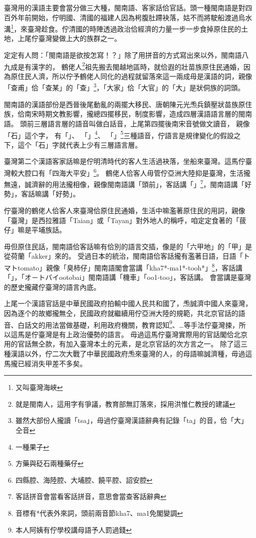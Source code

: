 \documentclass[final,oneside,onecolumn,12pt,a4paper]{book}%
\begin{document}
臺灣用的漢語主要會當分做三大種，閩南語、客家話佮官話\cite{外省族群的母語與國語}。頭一種閩南語是對四百外年前開始，佇明國、清國的福建人因為枵腹肚蹛袂落，姑不而將駛船渡過烏水溝\footnote{又叫臺灣海峽}，來臺灣趁食。佇清國的時陣透過政治佮經濟的力量一步一步食掉原住民的土地，上尾佇臺灣變做上大的族群之一。

定定有人問：「閩南語是欲按怎寫！？」除了用拼音的方式寫出來以外，閩南語八九成是有漢字的\cite{愛揣}，%
鶴佬人\footnote{就是閩南人，這用字有爭議，教育部無訂落來，採用洪惟仁教授的建議\cite{愛揣}}祖先搬去閩越地區時，就佮遐的壯苗族原住民通婚，因為原住民人濟，所以佇予鶴佬人同化的過程就留落來這一兩成毋是漢語的詞\cite{董忠司}，親像「查甫」佮「查某」的「查」\footnote{雖然大部份人攏讀「tsa」，毋過佇臺灣漢語辭典\cite{臺灣漢語辭典}有記錄「ta」的音，佮「大」仝音}，「大家」佮「大官」的「大」是狀侗族的詞頭。

閩南語的漢語部份是西晉後尾動亂的兩擺大移民、唐朝陳元光𤆬兵鎮壓狀苗族原住族，佮南宋時期文教影響，攏總四擺移民，制度影響，造成四層漢語語言層的閩南語\cite{閩客方言史稿}。
頭前三層語言層的語音叫做白話音，上尾第四擺後南宋音號做文讀音，
親像「石」這个字，
有「」、
「」\footnote{一種果子}、
「」\footnote{方藥與砭石兩種藥仔}三種語音，佇語言是規律變化的假設之下，這个「石」字就代表上少有三層語言層。

臺灣第二个漢語客家話嘛是佇明清時代的客人生活過袂落，坐船來臺灣。這馬佇臺灣較大腔口有「四海大平安」\footnote{四縣腔、海陸腔、大埔腔、饒平腔、詔安腔}。
鶴佬人佮客人毋管佇亞洲大陸抑是臺灣，生活攏無遠，誠濟辭的用法攏相像，親像閩南語講「頭前」，客話講「」\footnote{客話拼音會當看客話拼音\cite{客話拼音}，意思會當查客話辭典\cite{客話辭典}}，閩南語講「好勢」，客話嘛講「好勢」。

佇臺灣的鶴佬人佮客人來臺灣佮原住民通婚，生活中嘛濫著原住民的用詞，親像「臺灣」是西拉雅語「Taian」或「Tayan」對外地人的稱呼\cite{台灣名稱的由來}，咱定定食著的「菝仔」嘛是平埔族話\cite{客語外來語}。

毋但原住民話，閩南語佮客話嘛有佮別的語言交插，像是的「六甲地」的「甲」是從荷蘭「akker」來的\cite{台甲}。
受過日本的統治，閩南語佮客話攏有濫著日語，日語「トマトtomato」親像「臭柿仔」閩南語閣會當講「kha7*-ma1*-tooh*」\footnote{音標有*代表外來詞，頭前兩音節kha7、ma1免閣變調}，客話講「」，「オ－トバイootobai」閩南語講「機車」「oo1-too」，客話講。
會當講是臺灣的歷史攏藏佇臺灣的語言內底。

上尾一个漢語官話是中華民國政府拍輸中國人民共和國了，𤆬誠濟中國人來臺灣，因為逐个的故鄉攏無仝\cite{外省族群的母語與國語}，民國政府就繼續用佇亞洲大陸的規範，共北京官話的語音、白話文的用法當做基礎，利用政府機關，教育認知\footnote{本人阿姨有佇學校講母語予人罰過錢}、…等手法佇臺灣捒，所以這馬是佇臺灣是有上政治優勢的語言。
毋過這馬佇臺灣實際用的官話閣佮北京用的官話無仝款，有加入臺灣本土的元素，是北京官話的次方言之一。
除了這三種漢語以外，佇二次大戰了中華民國政府𤆬來臺灣的人，的母語嘛誠濟種，毋過這馬攏已經消失甲差不多矣。
\end{document}
